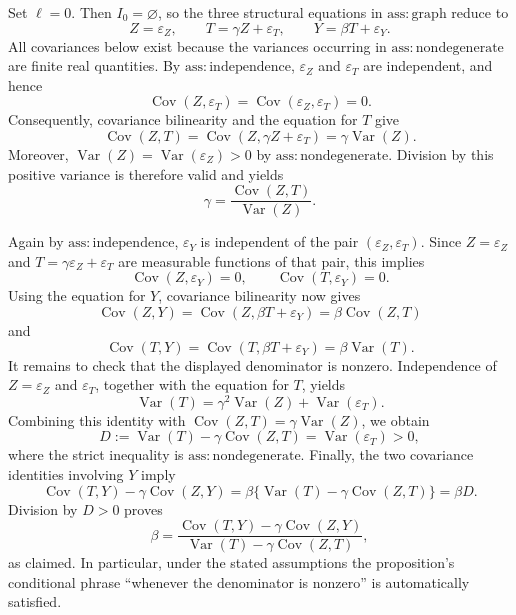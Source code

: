 Set \(\ell=0\).  Then \(I_0=\varnothing\), so the three structural equations in \(\mathrm{ass{:}graph}\) reduce to
\[
 Z=\varepsilon_Z,\qquad
 T=\gamma Z+\varepsilon_T,\qquad
 Y=\beta T+\varepsilon_Y.
\]
All covariances below exist because the variances occurring in \(\mathrm{ass{:}nondegenerate}\) are finite real quantities.  By \(\mathrm{ass{:}independence}\), \(\varepsilon_Z\) and \(\varepsilon_T\) are independent, and hence
\[
 \operatorname{Cov}(Z,\varepsilon_T)
 =\operatorname{Cov}(\varepsilon_Z,\varepsilon_T)=0.
\]
Consequently, covariance bilinearity and the equation for \(T\) give
\[
 \operatorname{Cov}(Z,T)
 =\operatorname{Cov}(Z,\gamma Z+\varepsilon_T)
 =\gamma\operatorname{Var}(Z).
\]
Moreover, \(\operatorname{Var}(Z)=\operatorname{Var}(\varepsilon_Z)>0\) by \(\mathrm{ass{:}nondegenerate}\).  Division by this positive variance is therefore valid and yields
\[
 \gamma=\frac{\operatorname{Cov}(Z,T)}{\operatorname{Var}(Z)}.
\]

Again by \(\mathrm{ass{:}independence}\), \(\varepsilon_Y\) is independent of the pair \((\varepsilon_Z,\varepsilon_T)\).  Since \(Z=\varepsilon_Z\) and \(T=\gamma\varepsilon_Z+\varepsilon_T\) are measurable functions of that pair, this implies
\[
 \operatorname{Cov}(Z,\varepsilon_Y)=0,
 \qquad
 \operatorname{Cov}(T,\varepsilon_Y)=0.
\]
Using the equation for \(Y\), covariance bilinearity now gives
\[
 \operatorname{Cov}(Z,Y)
 =\operatorname{Cov}(Z,\beta T+\varepsilon_Y)
 =\beta\operatorname{Cov}(Z,T)
\]
and
\[
 \operatorname{Cov}(T,Y)
 =\operatorname{Cov}(T,\beta T+\varepsilon_Y)
 =\beta\operatorname{Var}(T).
\]
It remains to check that the displayed denominator is nonzero.  Independence of \(Z=\varepsilon_Z\) and \(\varepsilon_T\), together with the equation for \(T\), yields
\[
 \operatorname{Var}(T)
 =\gamma^2\operatorname{Var}(Z)+\operatorname{Var}(\varepsilon_T).
\]
Combining this identity with \(\operatorname{Cov}(Z,T)=\gamma\operatorname{Var}(Z)\), we obtain
\[
 D:=\operatorname{Var}(T)-\gamma\operatorname{Cov}(Z,T)
 =\operatorname{Var}(\varepsilon_T)>0,
\]
where the strict inequality is \(\mathrm{ass{:}nondegenerate}\).  Finally, the two covariance identities involving \(Y\) imply
\[
 \operatorname{Cov}(T,Y)-\gamma\operatorname{Cov}(Z,Y)
 =\beta\bigl\{\operatorname{Var}(T)-\gamma\operatorname{Cov}(Z,T)\bigr\}
 =\beta D.
\]
Division by \(D>0\) proves
\[
 \beta
 =\frac{\operatorname{Cov}(T,Y)-\gamma\operatorname{Cov}(Z,Y)}
 {\operatorname{Var}(T)-\gamma\operatorname{Cov}(Z,T)},
\]
as claimed.  In particular, under the stated assumptions the proposition's conditional phrase ``whenever the denominator is nonzero'' is automatically satisfied.
